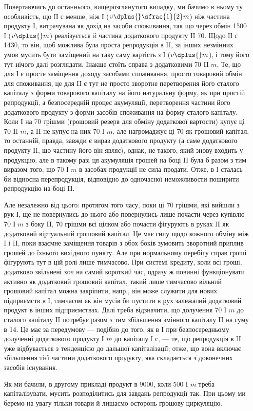 
Повертаючись до останнього, вищерозглянутого випадку, ми бачимо
в ньому ту особливість, що ІІ $с$ менше, ніж І ($v \dplus{} \sfrac{1}{2} m$) ніж частина
продукту І, витрачувана як дохід на засоби споживання, так що через
обмін 1500 І ($v \dplus{} m$) реалізується й частина додаткового продукту II \deq{} 70.
Щодо ІІ $с$ \deq{} 1430, то він, щоб можлива була проста репродукція в II,
за інших незмінних умов мусить бути заміщений на таку саму вартість
з І ($v \dplus{} m$), і тому його тут нічого далі розглядати. Інакше стоїть
справа з додатковими 70 II $m$. Те, що для І є просте заміщення доходу
засобами споживання, просто товаровий обмін для споживання, це для II
є тут не просто зворотне перетворення його сталого капіталу з форми
товарового капіталу на його натуральну форму, як при простій репродукції,
а безпосередній процес акумуляції, перетворення частини його
додаткового продукту з форми засобів споживання на форму сталого
капіталу. Коли І на 70 грішми (грошовий резерв для обміну
додаткової вартости) купує ці 70 II $m$, а II не купує на них 70 І $m$, але
нагромаджує ці 70 як грошовий капітал, то останній, правда,
завжди є вираз додаткового продукту (а саме додаткового продукту II,
що частину його він являє), однак, не такого, який знову входить у
продукцію; але в такому разі ця акумуляція грошей на боці II була б
разом з тим виразом того, що 70 І $m$ в засобах продукції не сила продати.
Отже, в І сталась би відносна перепродукція, відповідно до одночасної
неможливости поширити репродукцію на боці II.

Але незалежно від цього: протягом того часу, поки ці 70 грішми,
які вийшли з рук І, ще не повернулись до нього або повернулись лише
почасти через купівлю 70 І $m$ з боку II, 70 грішми всі цілком або почасти
фігурують в руках II як додатковий віртуальний грошовий капітал.
Це має силу щодо кожного обміну між І і II, поки взаємне заміщення
товарів з обох боків зумовить зворотний приплив грошей до їхнього
вихідного пункту. Але при нормальному перебігу справ гроші
фігурують тут в цій ролі лише тимчасово. При системі кредиту, коли
всі гроші, додатково звільнені хоч на самий короткий час, одразу ж повинні
функціонувати активно як додатковий грошовий капітал, такий лише
тимчасово вільний грошовий капітал можна закріпити, напр., він може
служити для нових підприємств в І, тимчасом як він мусів би пустити в
рух залежалий додатковий продукт в інших підприємствах. Далі треба
відзначити, що долучення 70 І $m$ до сталого капіталу II потребує разом
з тим збільшення змінного капіталу II на суму в 14. Це має за передумову
— подібно до того, як в І при безпосередньому долученні додаткового
продукту І $m$ до капіталу І $с$, — те, що репродукція в II уже відбувається
з тенденцією до дальшої капіталізації; отже, що вона включає збільшення
тієї частини додаткового продукту, яка складається з доконечних засобів
існування.

Як ми бачили, в другому прикладі продукт в 9000, коли 500 І $m$
треба капіталізувати, мусить розподілитись для завдань репродукції так.
При цьому ми беремо на увагу тільки товари й лишаємо осторонь грошову
циркуляцію.
